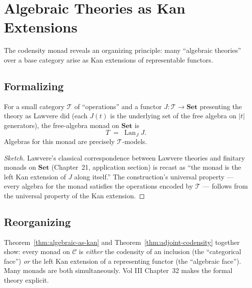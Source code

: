 \section{Algebraic Theories as Kan Extensions}
\label{sec:algebraic-as-kan}

The codensity monad reveals an organizing principle: many ``algebraic
theories'' over a base category arise as Kan extensions of representable
functors.

\subsection{Formalizing}

\begin{theorem}
\label{thm:algebraic-as-kan}
For a small category $\mathcal{T}$ of ``operations'' and a functor $J :
\mathcal{T} \to \mathbf{Set}$ presenting the theory as Lawvere did (each
$J(t)$ is the underlying set of the free algebra on $|t|$ generators), the
free-algebra monad on $\mathbf{Set}$ is
\begin{equation*}
  T \;=\; \operatorname{Lan}_J J.
\end{equation*}
Algebras for this monad are precisely $\mathcal{T}$-models.
\end{theorem}

\begin{proof}[Sketch]
Lawvere's classical correspondence between Lawvere theories and finitary
monads on $\mathbf{Set}$ (Chapter~21, application section) is recast as
``the monad is the left Kan extension of $J$ along itself.'' The
construction's universal property — every algebra for the monad satisfies
the operations encoded by $\mathcal{T}$ — follows from the universal
property of the Kan extension.
\end{proof}

\subsection{Reorganizing}

\begin{remark}
Theorem~\ref{thm:algebraic-as-kan} and Theorem~\ref{thm:adjoint-codensity}
together show: every monad on $\mathcal{C}$ is \emph{either} the codensity
of an inclusion (the ``categorical face'') \emph{or} the left Kan extension
of a representing functor (the ``algebraic face''). Many monads are both
simultaneously. Vol III Chapter~32 makes the formal theory explicit.
\end{remark}


